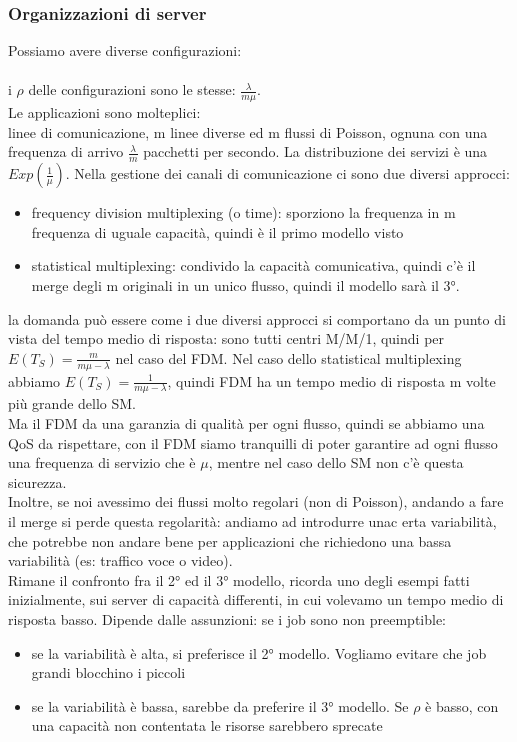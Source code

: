 \documentclass{article}
\begin{document}
\subsubsection{Organizzazioni di server} 
Possiamo avere diverse configurazioni:\\
\\ i $\rho$ delle configurazioni sono le stesse: $\frac{\lambda}{m \mu}$.\\ Le applicazioni sono molteplici:
\\ linee di comunicazione, m linee diverse ed m flussi di Poisson, ognuna con una frequenza di arrivo $\frac{\lambda}{m}$ pacchetti per secondo. La distribuzione dei servizi è una $Exp(\frac{1}{\mu})$. Nella gestione dei canali di comunicazione ci sono due diversi approcci:
\begin{itemize}
\item frequency division multiplexing (o time): sporziono la frequenza in m frequenza di uguale capacità, quindi è il primo modello visto
\item statistical multiplexing: condivido la capacità comunicativa, quindi c'è il merge degli m originali in un unico flusso, quindi il modello sarà il 3°.
\end{itemize}
la domanda può essere come i due diversi approcci si comportano da un punto di vista del tempo medio di risposta: sono tutti centri M/M/1, quindi per $E(T_S) = \frac{m}{m \mu - \lambda}$ nel caso del FDM. Nel caso dello statistical multiplexing abbiamo $E(T_S) = \frac{1}{m \mu - \lambda}$, quindi FDM ha un tempo medio di risposta m volte più grande dello SM.\\ Ma il FDM da una garanzia di qualità per ogni flusso, quindi se abbiamo una QoS da rispettare, con il FDM siamo tranquilli di poter garantire ad ogni flusso una frequenza di servizio che è $\mu$, mentre nel caso dello SM non c'è questa sicurezza.\\ Inoltre, se noi avessimo dei flussi molto regolari (non di Poisson), andando a fare il merge si perde questa regolarità: andiamo ad introdurre unac erta variabilità, che potrebbe non andare bene per applicazioni che richiedono una bassa variabilità (es: traffico voce o video).\\ Rimane il confronto fra il 2° ed il 3° modello, ricorda uno degli esempi fatti inizialmente, sui server di capacità differenti, in cui volevamo un tempo medio di risposta basso. Dipende dalle assunzioni: se i job sono non preemptible:
\begin{itemize}
\item se la variabilità è alta, si preferisce il 2° modello. Vogliamo evitare che job grandi blocchino i piccoli
\item se la variabilità è bassa, sarebbe da preferire il 3° modello. Se $\rho$ è basso, con una capacità non contentata le risorse sarebbero sprecate
\end{itemize}
\end{document}
